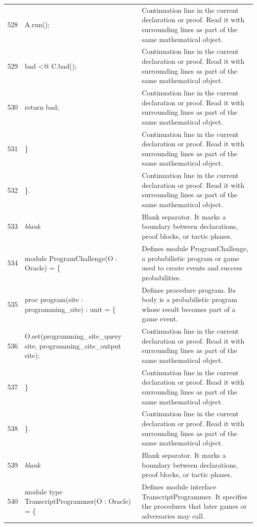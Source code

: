 \documentclass[10pt]{article}
\begin{document}
\begin{longtable}{r L{0.53\textwidth} L{0.37\textwidth}}
528 & {\ttfamily\scriptsize     A.run();} & Continuation line in the current declaration or proof.  Read it with surrounding lines as part of the same mathematical object. \\
529 & {\ttfamily\scriptsize     bad <@ C.bad();} & Continuation line in the current declaration or proof.  Read it with surrounding lines as part of the same mathematical object. \\
530 & {\ttfamily\scriptsize     return bad;} & Continuation line in the current declaration or proof.  Read it with surrounding lines as part of the same mathematical object. \\
531 & {\ttfamily\scriptsize   \}} & Continuation line in the current declaration or proof.  Read it with surrounding lines as part of the same mathematical object. \\
532 & {\ttfamily\scriptsize \}.} & Continuation line in the current declaration or proof.  Read it with surrounding lines as part of the same mathematical object. \\
533 & {\ttfamily\scriptsize \emph{blank}} & Blank separator.  It marks a boundary between declarations, proof blocks, or tactic phases. \\
534 & {\ttfamily\scriptsize module ProgramChallenge(O : Oracle) = \{} & Defines module ProgramChallenge, a probabilistic program or game used to create events and success probabilities. \\
535 & {\ttfamily\scriptsize   proc program(site : programming\_site) : unit = \{} & Defines procedure program.  Its body is a probabilistic program whose result becomes part of a game event. \\
536 & {\ttfamily\scriptsize     O.set(programming\_site\_query site, programming\_site\_output site);} & Continuation line in the current declaration or proof.  Read it with surrounding lines as part of the same mathematical object. \\
537 & {\ttfamily\scriptsize   \}} & Continuation line in the current declaration or proof.  Read it with surrounding lines as part of the same mathematical object. \\
538 & {\ttfamily\scriptsize \}.} & Continuation line in the current declaration or proof.  Read it with surrounding lines as part of the same mathematical object. \\
539 & {\ttfamily\scriptsize \emph{blank}} & Blank separator.  It marks a boundary between declarations, proof blocks, or tactic phases. \\
540 & {\ttfamily\scriptsize module type TranscriptProgrammer(O : Oracle) = \{} & Defines module interface TranscriptProgrammer.  It specifies the procedures that later games or adversaries may call. \\

\end{longtable}
\end{document}
